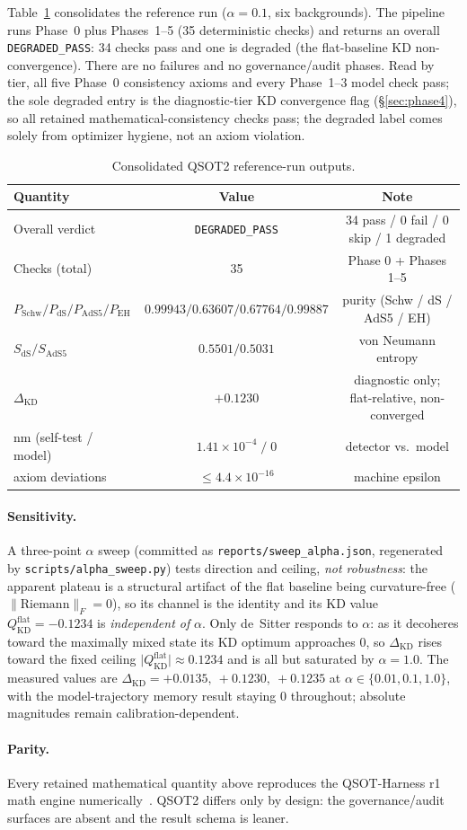 Table~\ref{tab:qsot2_results} consolidates the reference run ($\alpha=0.1$, six
backgrounds). The pipeline runs Phase~0 plus Phases~1--5 (35 deterministic checks) and
returns an overall \texttt{DEGRADED\_PASS}: 34 checks pass and one is degraded (the
flat-baseline KD non-convergence). There are no failures and no governance/audit phases.
Read by tier, all five Phase~0 consistency axioms and every Phase~1--3 model check pass;
the sole degraded entry is the diagnostic-tier KD convergence flag (\S\ref{sec:phase4}), so
all retained mathematical-consistency checks pass; the degraded label comes solely from
optimizer hygiene, not an axiom violation.

\begin{table}[h]
\centering
\small
\begin{tabular}{@{}lcc@{}}
\toprule
Quantity & Value & Note \\
\midrule
Overall verdict & \texttt{DEGRADED\_PASS} & 34 pass / 0 fail / 0 skip / 1 degraded \\
Checks (total) & 35 & Phase 0 + Phases 1--5 \\
$P_{\mathrm{Schw}}/P_{\mathrm{dS}}/P_{\mathrm{AdS5}}/P_{\mathrm{EH}}$
  & $0.99943/0.63607/0.67764/0.99887$ & purity (Schw / dS / AdS5 / EH) \\
$S_{\mathrm{dS}}/S_{\mathrm{AdS5}}$ & $0.5501/0.5031$ & von Neumann entropy \\
$\Delta_{\mathrm{KD}}$ & $+0.1230$ & diagnostic only; flat-relative, non-converged \\
$\mathrm{nm}$ (self-test / model) & $1.41\times10^{-4}\;/\;0$ & detector vs.\ model \\
axiom deviations & $\le 4.4\times10^{-16}$ & machine epsilon \\
\bottomrule
\end{tabular}
\caption{Consolidated QSOT2 reference-run outputs.}
\label{tab:qsot2_results}
\end{table}

\paragraph{Sensitivity.} A three-point $\alpha$ sweep (committed as
\texttt{reports/sweep\_alpha.json}, regenerated by \texttt{scripts/alpha\_sweep.py}) tests
direction and ceiling, \emph{not robustness}: the apparent plateau is a structural artifact
of the flat baseline being curvature-free ($\lVert\mathrm{Riemann}\rVert_F=0$), so its
channel is the identity and its KD value $Q^{\text{flat}}_{\mathrm{KD}}=-0.1234$ is
\emph{independent of} $\alpha$. Only de~Sitter responds to $\alpha$: as it decoheres toward
the maximally mixed state its KD optimum approaches $0$, so $\Delta_{\mathrm{KD}}$ rises
toward the fixed ceiling $\lvert Q^{\text{flat}}_{\mathrm{KD}}\rvert\approx 0.1234$ and is
all but saturated by $\alpha=1.0$. The measured values are
$\Delta_{\mathrm{KD}} = +0.0135,\ +0.1230,\ +0.1235$ at $\alpha\in\{0.01, 0.1, 1.0\}$,
with the model-trajectory memory result staying $0$ throughout; absolute magnitudes remain
calibration-dependent.

\paragraph{Parity.} Every retained mathematical quantity above reproduces the
QSOT-Harness r1 math engine numerically~\cite{QSOTHarness2026}. QSOT2 differs only by design: the
governance/audit surfaces are absent and the result schema is leaner.
